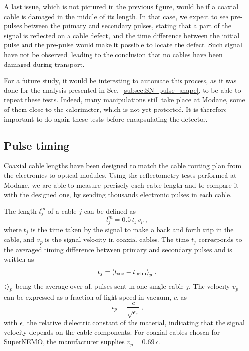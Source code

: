 A last issue, which is not pictured in the previous figure, would be if a coaxial cable is damaged in the middle of its length.
In that case, we expect to see pre-pulses between the primary and secondary pulses, stating that a part of the signal is reflected on a cable defect, and the time difference between the initial pulse and the pre-pulse would make it possible to locate the defect.
Such signal have not be observed, leading to the conclusion that no cables have been damaged during transport.

For a future study, it would be interesting to automate this process, as it was done for the analysis presented in Sec.~\ref{subsec:SN_pulse_shape}, to be able to repeat these tests.
Indeed, many manipulations still take place at Modane, some of them close to the calorimeter, which is not yet protected.
It is therefore important to do again these tests before encapsulating the detector.

\subsection{Pulse timing}
\label{subsec:timing}

Coaxial cable lengths have been designed to match the cable routing plan from the electronics to optical modules.
Using the reflectometry tests performed at Modane, we are able to measure precisely each cable length and to compare it with the designed one, by sending thousands electronic pulses in each cable.

The length $l_{j}^{m}$ of a cable $j$ can be defined as
\begin{equation}
  l_{j}^{m}= 0.5\,t_{j}\,v_{p}\, ,
\end{equation}
where $t_{j}$ is the time taken by the signal to make a back and forth trip in the cable, and $v_{p}$ is the signal velocity in coaxial cables.
The time $t_{j}$ corresponds to the averaged timing difference between primary and secondary pulses and is written as
\begin{equation}
  t_{j} = \braket{t_{\text{sec}}-t_{\text{prim}}}_{p} \, \text{,}
  \label{eq:t_j}
\end{equation}
$\braket{}_{p}$ being the average over all pulses sent in one single cable $j$.
The velocity $v_{p}$ can be expressed as a fraction of light speed in vacuum, $c$, as
\begin{equation*}
  v_{p}=\frac{c}{\sqrt{\epsilon_{r}}}\,\text{,}
\end{equation*}
with $\epsilon_{r}$ the relative dielectric constant of the material, indicating that the signal velocity depends on the cable components.
For coaxial cables chosen for SuperNEMO, the manufacturer supplies ${v_{p}=0.69\,c}$.

